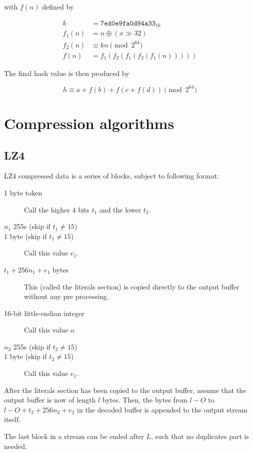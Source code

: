 \documentclass[11pt,a4paper]{report}
\begin{document}
        with $f(n)$ defined by

        \begin{align*}
            k      &=      \texttt{7ed0e9fa0d94a33}_{16} \\
            f_1(n) &=      n \oplus (x \gg 32) \\
            f_2(n) &\equiv kn \pmod{2^{64}} \\
            f(n)   &=      f_1(f_2(f_1(f_2(f_1(n)))))
        \end{align*}

        The final hash value is then produced by

        $$h \equiv a + f(b) + f(c + f(d)) \pmod{2^{64}}$$

    \section{Compression algorithms}
        \subsection{LZ4}
        \label{compression:lz4}
        LZ4 compressed data is a series of blocks, subject to following format:

        \begin{description}
            \item [1 byte token] Call the higher 4 bits $t_1$ and the lower $t_2$.
            \item [$n_1$ 255s (skip if $t_1 \neq 15$)]
            \item [1 byte (skip if $t_1 \neq 15$)] Call this value $e_1$.
            \item [$t_1 + 256n_1 + e_1$ bytes] This (called the literals
                section) is copied directly to the output buffer without any
                pre processing.
            \item [16-bit little-endian integer] Call this value $o$.
            \item [$n_2$ 255s (skip if $t_2 \neq 15$)]
            \item [1 byte (skip if $t_2 \neq 15$)] Call this value $e_1$.
        \end{description}

        After the literals section has been copied to the output buffer, assume
        that the output buffer is now of length $l$ bytes. Then, the bytes from
        $l - O$ to $l - O + t_2 + 256n_2 + e_2$ in the decoded buffer is
        appended to the output stream itself.

        The last block in a stream can be ended after $L$, such that no
        duplicates part is needed.
\end{document}

